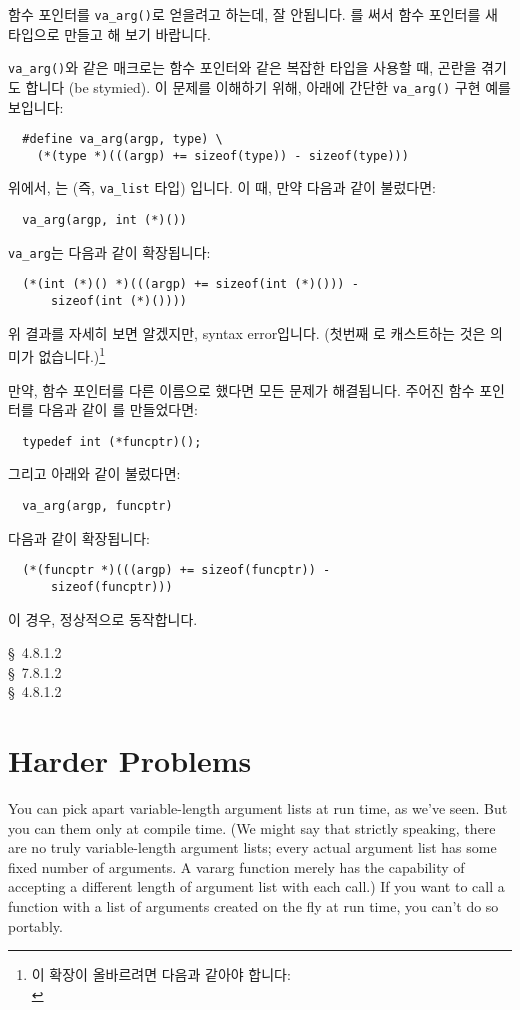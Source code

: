 \begin{faq}
	함수 포인터를 \verb+va_arg()+로 얻을려고 하는데, 잘 안됩니다.
\A
	를 써서 함수 포인터를 새 타입으로 만들고 해 보기 바랍니다.

	\verb+va_arg()+와 같은 매크로는 함수 포인터와 같은 복잡한 타입을
	사용할 때, 곤란을 겪기도 합니다 (be stymied). 이 문제를 이해하기 위해,
        아래에 간단한 \verb+va_arg()+ 구현 예를 보입니다:
\begin{verbatim}
  #define va_arg(argp, type) \
    (*(type *)(((argp) += sizeof(type)) - sizeof(type)))
\end{verbatim}
	\noindent 위에서, 는 (즉, \verb+va_list+ 타입) 
        입니다. 이 때, 만약 다음과 같이 불렀다면:
\begin{verbatim}
  va_arg(argp, int (*)())
\end{verbatim}
	\noindent \verb+va_arg+는 다음과 같이 확장됩니다:
\begin{verbatim}
  (*(int (*)() *)(((argp) += sizeof(int (*)())) -
      sizeof(int (*)())))
\end{verbatim}
	\noindent 위 결과를 자세히 보면 알겠지만, syntax error입니다. (첫번째
        로 캐스트하는 것은 의미가 없습니다.)\footnote{이 확장이
          올바르려면 다음과 같아야 합니다:\\
        }
          
	만약, 함수 포인터를 다른 이름으로 했다면 모든 문제가 해결됩니다.
        주어진 함수 포인터를 다음과 같이 \TT{typedef}를 만들었다면:
\begin{verbatim}
  typedef int (*funcptr)();
\end{verbatim}
	\noindent 그리고 아래와 같이 불렀다면:
\begin{verbatim}
  va_arg(argp, funcptr)
\end{verbatim}
	\noindent 다음과 같이 확장됩니다:
\begin{verbatim}
  (*(funcptr *)(((argp) += sizeof(funcptr)) -
      sizeof(funcptr)))
\end{verbatim}
	\noindent 이 경우, 정상적으로 동작합니다.

\R
	\cite{ansi} \S\ 4.8.1.2 \\
	\cite{c89} \S\ 7.8.1.2 \\
	\cite{rationale} \S\ 4.8.1.2
\end{faq}

\section{Harder Problems}
You can pick apart variable-length argument lists at run time, as we've seen.
But you can \EM{create} them only at compile time.  (We might say that strictly
speaking, there are no truly variable-length argument lists; every actual
argument list has some fixed number of arguments.  A vararg function merely
has the capability of accepting a different length of argument list with
each call.)  
If you want to call a function with a list of arguments created on the fly
at run time, you can't do so portably.

